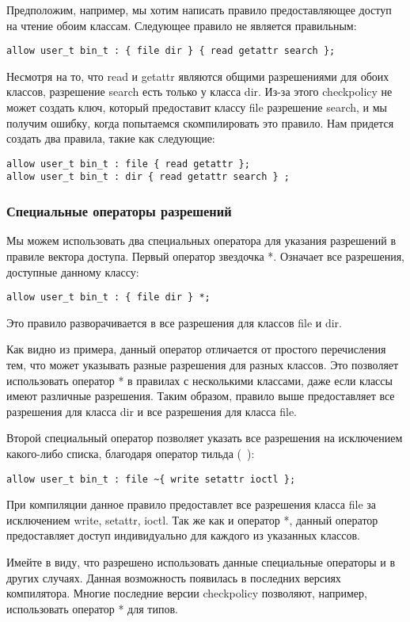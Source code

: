 \documentclass{./../class/UIR}
\begin{document}
    Предположим, например, мы хотим написать правило предоставляющее доступ на
    чтение обоим классам. Следующее правило не является правильным:
\begin{verbatim}
allow user_t bin_t : { file dir } { read getattr search };
\end{verbatim}
    Несмотря на то, что read и getattr являются общими разрешениями для обоих
    классов, разрешение search есть только у класса dir. Из-за этого checkpolicy
    не может создать ключ, который предоставит классу file разрешение search, и
    мы получим ошибку, когда попытаемся скомпилировать это правило. Нам придется
    создать два правила, такие как следующие:
\begin{verbatim}
allow user_t bin_t : file { read getattr };
allow user_t bin_t : dir { read getattr search } ;
\end{verbatim}
\subsubsection{Специальные операторы разрешений}
    Мы можем использовать два специальных оператора для указания разрешений в
    правиле вектора доступа. Первый оператор звездочка *. Означает все
    разрешения, доступные данному классу:
\begin{verbatim}
allow user_t bin_t : { file dir } *;
\end{verbatim}
    Это правило разворачивается в все разрешения для классов file и dir.

    Как видно из примера, данный оператор отличается от простого перечисления
    тем, что может указывать разные разрешения для разных классов. Это позволяет
    использовать оператор  * в правилах с несколькими классами, даже если классы
    имеют различные разрешения. Таким образом, правило выше предоставляет все
    разрешения для класса dir и все разрешения для класса file.

    Второй специальный оператор позволяет указать все разрешения на исключением
    какого-либо списка, благодаря оператор тильда (~):
\begin{verbatim}
allow user_t bin_t : file ~{ write setattr ioctl };
\end{verbatim}
    При компиляции данное правило предоставлет все разрешения класса file за
    исключением write, setattr, ioctl. Так же как и оператор *, данный оператор
    предоставляет доступ индивидуально для каждого из указанных классов.

    Имейте в виду, что разрешено использовать данные специальные операторы и в
    других случаях. Данная возможность появилась в последних версиях
    компилятора. Многие последние версии checkpolicy позволяют, например,
    использовать оператор * для типов.
\end{document}

